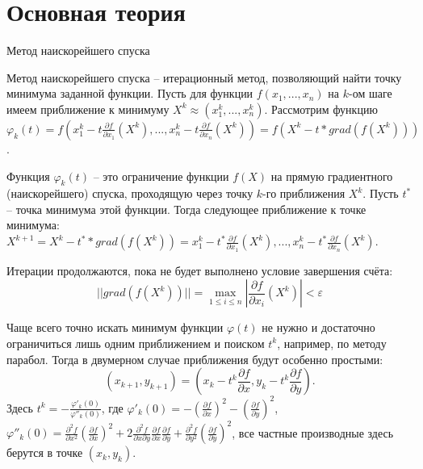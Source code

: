 \documentclass[a4paper, 14pt]{extarticle}
\begin{document}
\section{Основная теория}
\begin{justify}

\noindent\large {Метод наискорейшего спуска}\\ \normalsize

Метод наискорейшего спуска -- итерационный метод, позволяющий найти 
точку минимума заданной функции. Пусть для функции $f(x_1, ..., x_n)$ на $k$-ом шаге 
имеем приближение к минимуму $X^k \approx (x^k_1, ..., x^k_n)$. Рассмотрим функцию 
$\varphi_k(t) = f(x^k_1 - t \frac{\partial f}{\partial x_1}(X^k), ..., 
x^k_n - t \frac{\partial f}{\partial x_n}(X^k)) = f(X^k - t*grad(f(X^k)))$. 

Функция $\varphi_k(t)$ -- это ограничение функции $f(X)$ на прямую градиентного 
(наискорейшего) спуска, проходящую через точку $k$-го приближения $X^k$.
Пусть $t^*$ -- точка минимума этой функции. Тогда следующее приближение к 
точке минимума:
$X^{k+1} = X^k -t^* * grad(f(X^k)) = x^k_1 - t^* \frac{\partial f}{\partial x_1}(X^k), ..., x^k_n - t^* \frac{\partial f}{\partial x_n}(X^k)$.

Итерации продолжаются, пока не будет выполнено условие завершения счёта: 
\[	
	||grad(f(X^k))|| = \max_{1 \le i \le n}{|\frac{\partial f}{\partial x_i}(X^k)|} < \varepsilon
\]

Чаще всего точно искать минимум функции $\varphi(t)$ не нужно и достаточно 
ограничиться лишь одним приближением и поиском $t^k$, например, по методу парабол.
Тогда в двумерном случае приближения будут особенно простыми: 
\[
	(x_{k+1}, y_{k+1}) = (x_k -t^k \frac{\partial f}{\partial x}, 
	y_k -t^k \frac{\partial f}{\partial y}).
\]
Здесь $t^k = -\frac{\varphi'_k(0)}{\varphi''_k(0)}$, где 
$\varphi'_k(0) = - (\frac{\partial f}{\partial x})^2 
- (\frac{\partial f}{\partial y})^2$, 
$\varphi''_k(0) = \frac{\partial^2 f}{\partial x^2} (\frac{\partial f}{\partial x})^2  + 2 \frac{\partial^2 f}{\partial x \partial y} \frac{\partial f}{\partial x} 
\frac{\partial f}{\partial y} + \frac{\partial^2 f}{\partial y^2} 
(\frac{\partial f}{\partial y})^2$, все частные производные здесь берутся в точке 
$(x_k, y_k)$.


\end{justify}
\pagebreak
\end{document}
